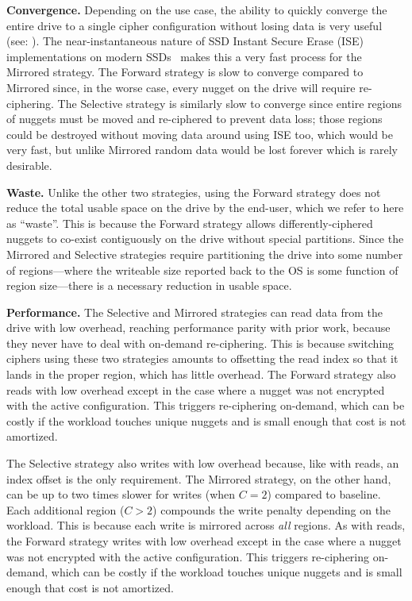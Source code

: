 \textbf{Convergence.} Depending on the use case, the ability to quickly converge
the entire drive to a single cipher configuration without losing data is very
useful (see: ). The near-instantaneous nature of SSD Instant
Secure Erase (ISE) implementations on modern SSDs~\cite{ISE1,ISE2,ISE3} makes
this a very fast process for the Mirrored strategy. The Forward strategy is slow
to converge compared to Mirrored since, in the worse case, every nugget on the
drive will require re-ciphering. The Selective strategy is similarly slow to
converge since entire regions of nuggets must be moved and re-ciphered to
prevent data loss; those regions could be destroyed without moving data around
using ISE too, which would be very fast, but unlike Mirrored random data would
be lost forever which is rarely desirable.

\textbf{Waste.} Unlike the other two strategies, using the Forward strategy does
not reduce the total usable space on the drive by the end-user, which we refer
to here as ``waste''. This is because the Forward strategy allows
differently-ciphered nuggets to co-exist contiguously on the drive without
special partitions. Since the Mirrored and Selective strategies require
partitioning the drive into some number of regions---where the writeable size
reported back to the OS is some function of region size---there is a necessary
reduction in usable space.

\textbf{Performance.} The Selective and Mirrored strategies can read data from
the drive with low overhead, reaching performance parity with prior work,
because they never have to deal with on-demand re-ciphering. This is because
switching ciphers using these two strategies amounts to offsetting the read
index so that it lands in the proper region, which has little overhead. The
Forward strategy also reads with low overhead except in the case where a nugget
was not encrypted with the active configuration. This triggers re-ciphering
on-demand, which can be costly if the workload touches unique nuggets and is
small enough that cost is not amortized.

The Selective strategy also writes with low overhead because, like with reads,
an index offset is the only requirement. The Mirrored strategy, on the other
hand, can be up to two times slower for writes (when $C = 2$) compared to
baseline. Each additional region ($C > 2$) compounds the write penalty depending
on the workload. This is because each write is mirrored across \emph{all}
regions. As with reads, the Forward strategy writes with low overhead except in
the case where a nugget was not encrypted with the active configuration. This
triggers re-ciphering on-demand, which can be costly if the workload touches
unique nuggets and is small enough that cost is not amortized.\\

